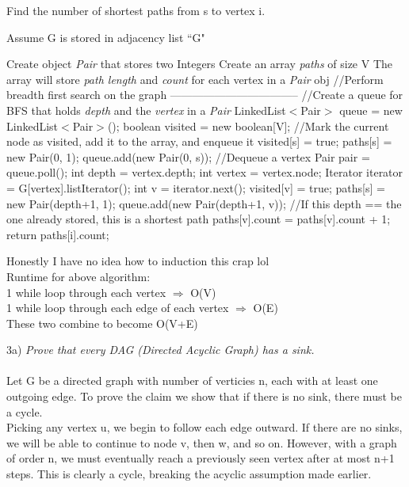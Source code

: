 \documentclass[12pt]{article}
\begin{document}
\begin{algorithm}[H]
\caption{Find the number of shortest paths from s to vertex i.}
\begin{algorithmic}
\State Assume G is stored in adjacency list ``G"

\State 
\State Create object \textit{Pair} that stores two Integers
\State Create an array \textit{paths} of size V
\State The array will store \textit{path length} and \textit{count} for each vertex in a \textit{Pair} obj
\State
\State //Perform breadth first search on the graph -----------------------------------
\State
\State //Create a queue for BFS that holds \textit{depth} and the \textit{vertex} in a \textit{Pair}
\State LinkedList$<$Pair$>$ queue = new LinkedList$<$Pair$>$();
\State boolean visited = new boolean[V];
\State
\State //Mark the current node as visited, add it to the array, and enqueue it 
\State visited[s] = true; 
\State paths[s] = new Pair(0, 1);
\State queue.add(new Pair(0, s)); 
\State
{}
\State //Dequeue a vertex
\State Pair pair = queue.poll(); 
\State int depth = vertex.depth;
\State int vertex = vertex.node;
\State
\State Iterator iterator = G[vertex].listIterator();
\State int v = iterator.next(); 
\State
{}
\State visited[v] = true; 
\State paths[s] = new Pair(depth+1, 1);
\State queue.add(new Pair(depth+1, v));
\State
{}
\State //If this depth == the one already stored, this is a shortest path
\State paths[v].count = paths[v].count + 1;
\EndIf
\EndWhile
\EndWhile
\State return paths[i].count;

\end{algorithmic}
\end{algorithm}
Honestly I have no idea how to induction this crap lol\\
\noindent Runtime for above algorithm: \\
1 while loop through each vertex $\Rightarrow$ O(V)\\
1 while loop through each edge of each vertex $\Rightarrow$ O(E)\\
These two combine to become O(V+E)



\pagebreak


\noindent 3a) \textit{Prove that every DAG (Directed Acyclic Graph) has a sink.}\\\\
Let G be a directed graph with number of verticies n, each with at least one outgoing edge. To prove the claim we show that if there is no sink, there must be a cycle. \\
Picking any vertex u, we begin to follow each edge outward. If there are no sinks, we will be able to continue to node v, then w, and so on. However, with a graph of order n, we must eventually reach a previously seen vertex after at most n+1 steps. This is clearly a cycle, breaking the acyclic assumption made earlier.
\end{document}

